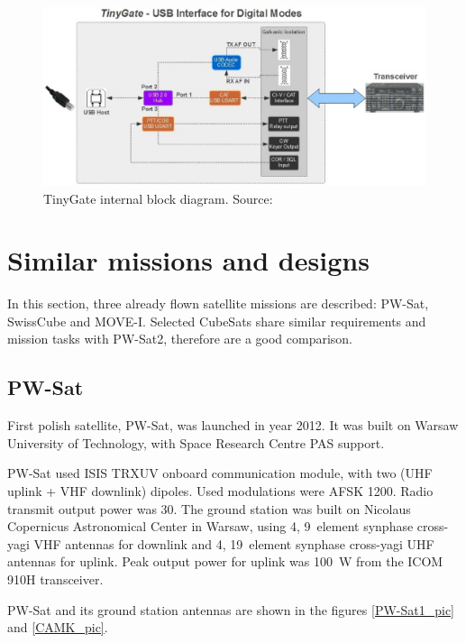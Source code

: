 \begin{figure}[H]
    \centering
    \includegraphics[width=0.7\paperwidth]{img/4/tinygate_schematic.jpg}
    \caption{TinyGate internal block diagram. Source: \cite{tinygate_manual}}
    \label{tnc:tinygate_schema}
\end{figure}

\newpage

\section{Similar missions and designs}
In this section, three already flown satellite missions are described: PW-Sat, SwissCube and MOVE-I. Selected CubeSats share similar requirements and mission tasks with PW-Sat2, therefore are a good comparison.

\subsection{PW-Sat}
First polish satellite, PW-Sat, was launched in year \si{2012}. It was built on Warsaw University of Technology, with Space Research Centre PAS support. 

PW-Sat used ISIS TRXUV onboard communication module, with two (UHF uplink + VHF downlink) dipoles. Used modulations were AFSK \SI{1200}{\bps}. Radio transmit output power was \SI{30}{\dBm}. 
The ground station was built on Nicolaus Copernicus Astronomical Center in Warsaw, using \si{4}, \si{9}~element synphase cross-yagi VHF antennas for downlink and \si{4}, \si{19}~element synphase cross-yagi UHF antennas for uplink. Peak output power for uplink was \SI{100}{\watt} from the ICOM 910H transceiver.

PW-Sat and its ground station antennas are shown in the figures \ref{PW-Sat1_pic} and \ref{CAMK_pic}.

